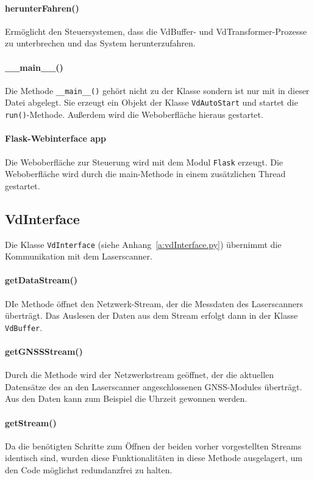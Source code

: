 \documentclass[a4paper,12pt,bibliography=totoc, listof=totoc,titlepage,pointlessnumbers]{scrreprt}
\newcommand{\code}[1]{\texttt{#1}}
\begin{document}
\paragraph{herunterFahren()}
Ermöglicht den Steuersystemen, dass die VdBuffer- und VdTransformer-Prozesse zu unterbrechen und das System herunterzufahren.

\paragraph{\_\_main\_\_()}
Die Methode \code{\_\_main\_\_()} gehört nicht zu der Klasse sondern ist nur mit in dieser Datei abgelegt. Sie erzeugt ein Objekt der Klasse \code{VdAutoStart} und startet die \code{run()}-Methode. Außerdem wird die Weboberfläche hieraus gestartet.

\paragraph{Flask-Webinterface app}
Die Weboberfläche zur Steuerung wird mit dem Modul \code{Flask} erzeugt. Die Weboberfläche wird durch die main-Methode in einem zusätzlichen Thread gestartet.

\subsection{VdInterface}
Die Klasse \code{VdInterface} (siehe Anhang~\ref{a:vdInterface.py}) übernimmt die Kommunikation mit dem Laserscanner.

\paragraph{getDataStream()}
DIe Methode öffnet den Netzwerk-Stream, der die Messdaten des Laserscanners überträgt. Das Auslesen der Daten aus dem Stream erfolgt dann in der Klasse \code{VdBuffer}.

\paragraph{getGNSSStream()}
Durch die Methode wird der Netzwerkstream geöffnet, der die aktuellen Datensätze des an den Laserscanner angeschlossenen GNSS-Modules überträgt. Aus den Daten kann zum Beispiel die Uhrzeit gewonnen werden.

\paragraph{getStream()}
Da die benötigten Schritte zum Öffnen der beiden vorher vorgestellten Streams identisch sind, wurden diese Funktionalitäten in diese Methode ausgelagert, um den Code möglichst redundanzfrei zu halten.
\end{document}
